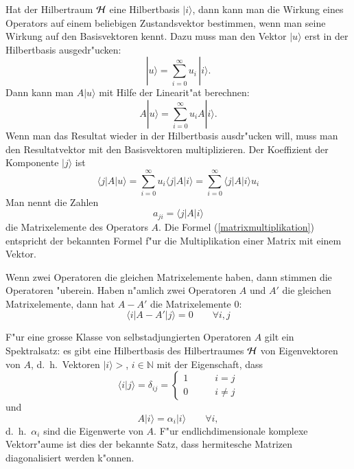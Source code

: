 Hat der Hilbertraum $\cal H$ eine Hilbertbasis $|i\rangle$, dann kann
man die Wirkung eines Operators auf einem beliebigen Zustandsvektor
bestimmen, wenn man seine Wirkung auf den Basisvektoren kennt.
Dazu muss man den Vektor $|u\rangle$ erst in der Hilbertbasis
ausgedr"ucken:
\[
|u\rangle = \sum_{i=0}^\infty u_i\, |i\rangle.
\]
Dann kann man $A|u\rangle$ mit Hilfe der Linearit"at berechnen:
\[
A|u\rangle = \sum_{i=0}^\infty u_iA|i\rangle.
\]
Wenn man das Resultat wieder in der Hilbertbasis ausdr"ucken will, 
muss man den Resultatvektor mit den Basisvektoren multiplizieren.
Der Koeffizient der Komponente $|j\rangle$ ist
\begin{equation}
\langle j|A|u\rangle
=
\sum_{i=0}^\infty u_i \langle j|A|i\rangle
=
\sum_{i=0}^\infty \langle j|A|i\rangle u_i
\label{matrixmultiplikation}
\end{equation}
Man nennt die Zahlen
\[
a_{ji}=\langle j|A|i\rangle
\]
die Matrixelemente des Operators $A$. Die Formel (\ref{matrixmultiplikation})
entspricht der bekannten Formel f"ur die Multiplikation einer Matrix
mit einem Vektor.

Wenn zwei Operatoren die gleichen Matrixelemente haben, dann stimmen
die Operatoren "uberein. Haben n"amlich zwei Operatoren $A$ und $A'$
die gleichen Matrixelemente, dann hat $A-A'$ die Matrixelemente $0$:
\[
\langle i|A-A'|j\rangle =0\qquad\forall i,j
\]

F"ur eine grosse Klasse von selbstadjungierten Operatoren $A$ gilt ein
Spektralsatz: es gibt eine Hilbertbasis des Hilbertraumes $\cal H$
von Eigenvektoren von $A$, d.~h.~Vektoren $|i\rangle>$, $i\in\mathbb N$
mit der Eigenschaft, dass 
\[
\langle i|j\rangle = \delta_{ij}=\begin{cases}
1&\qquad i=j\\
0&\qquad i\ne j
\end{cases}
\]
und 
\[
A|i\rangle=\alpha_i|i\rangle\qquad\forall i,
\]
d.~h.~$\alpha_i$ sind die Eigenwerte von $A$.
F"ur endlichdimensionale komplexe Vektorr"aume ist dies der bekannte
Satz, dass hermitesche Matrizen diagonalisiert werden k"onnen.

